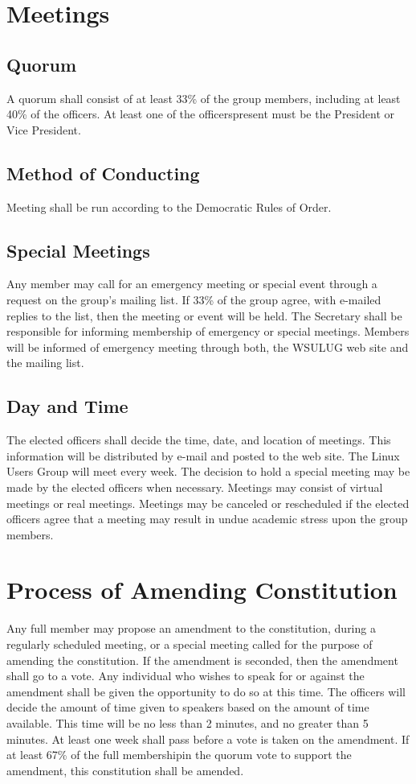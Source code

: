 \documentclass{article}
\begin{document}
\section{Meetings}
\subsection{Quorum}
A quorum shall consist of at least 33\% of the group members, including at least 40\% of the officers.  At least one of the officerspresent must be the President or Vice President.
\subsection{Method of Conducting}
Meeting shall be run according to the Democratic Rules of Order.
\subsection{Special Meetings}
Any member may call for an emergency meeting or special event through a request on the group's mailing list.  If 33\% of the group agree, with e-mailed replies to the list, then the meeting or event will be held. The Secretary shall be responsible for informing membership of emergency or special meetings. Members will be informed of emergency meeting through both, the WSULUG web site and the mailing list.
\subsection{Day and Time}
The elected officers shall decide the time, date, and location of meetings. This information will be distributed by e-mail and posted to the web site. The Linux Users Group will meet every week.  The decision to hold a special meeting may be made by the elected officers when necessary. Meetings may consist of virtual meetings or real meetings. Meetings may be canceled or rescheduled if the elected officers agree that a meeting may result in undue academic stress upon the group members.

\section{Process of Amending Constitution}
Any full member may propose an amendment to the constitution, during a regularly scheduled meeting, or a special meeting called for the purpose of amending the constitution. If the amendment is seconded, then the amendment shall go to a vote. Any individual who wishes to speak for or against the amendment shall be given the opportunity to do so at this time. The officers will decide the amount of time given to speakers based on the amount of time available. This time will be no less than 2 minutes, and no greater than 5 minutes. At least one week shall pass before a vote is taken on the amendment. If at least 67\% of the full membershipin the quorum vote to support the amendment, this constitution shall be amended.
\end{document}
